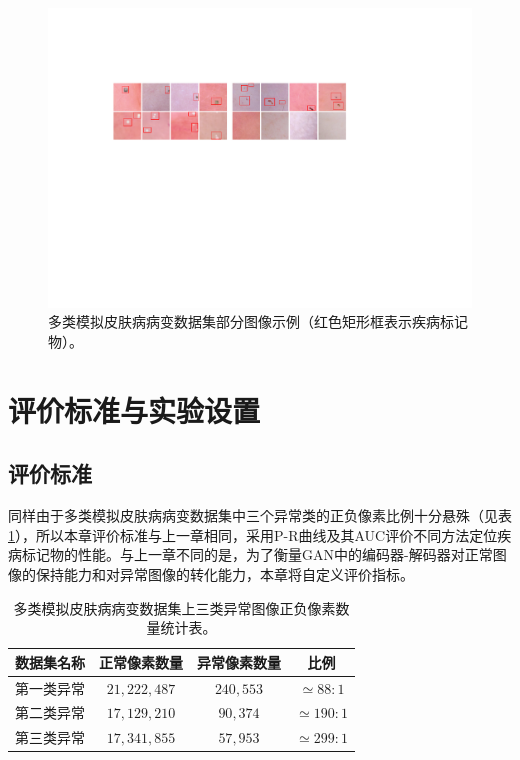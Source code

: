 \begin{figure}[h]
	\centering
	\includegraphics[width=1.0\textwidth]{figure/multi_classes_simulated_skin.pdf}
	\caption[多类模拟皮肤病病变数据集部分图像示例]{多类模拟皮肤病病变数据集部分图像示例（红色矩形框表示疾病标记物）。}
	\label{fig:mul_classes_simulated_ds}
\end{figure}
\vspace{-0.7cm}
\section{评价标准与实验设置}
\subsection{评价标准}
同样由于多类模拟皮肤病病变数据集中三个异常类的正负像素比例十分悬殊（见表\ref{tab:multi_ds_pixel_freqs}），所以本章评价标准与上一章相同，采用P-R曲线及其AUC评价不同方法定位疾病标记物的性能。与上一章不同的是，为了衡量GAN中的编码器-解码器对正常图像的保持能力和对异常图像的转化能力，本章将自定义评价指标。
\begin{table}[h]
	\centering
	\caption[多类模拟皮肤病病变数据集上三类异常图像正负像素数量统计表]{多类模拟皮肤病病变数据集上三类异常图像正负像素数量统计表。}
	\label{tab:multi_ds_pixel_freqs}
	\begin{tabular}{c|c|c|c}
		\toprule[2pt]
		数据集名称 & 正常像素数量 & 异常像素数量 & 比例 \\
		\midrule[2pt]
		第一类异常&  $21,222,487$ & $240,553$ & $\simeq 88: 1$ \\ \hline
		第二类异常&  $17,129,210$ & $90,374$ & $\simeq 190: 1$ \\ \hline
		第三类异常 & $17,341,855$ & $57,953$ & $\simeq 299: 1$ \\
		\bottomrule[2pt]
	\end{tabular}
\end{table}
\vspace{-0.7cm}
